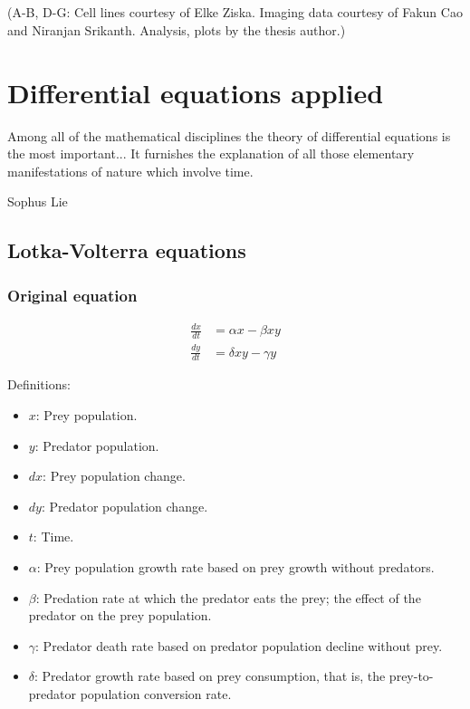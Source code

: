 \begin{centering}
{\\
\\
(A-B, D-G: Cell lines courtesy of Elke Ziska. Imaging data courtesy of Fakun Cao and Niranjan Srikanth. Analysis, plots by the thesis author.)}
\label{p3:2}
\end{centering}

\chapter{Differential equations applied}
\label{chapter:differential_equations}
\epigraph{Among all of the mathematical disciplines the theory of differential equations is the most important... It furnishes the explanation of all those elementary manifestations of nature which involve time.}{Sophus Lie}

\section{Lotka-Volterra equations}
\subsection{Original equation}
\begin{align*}
\frac{dx}{dt} &= \alpha x - \beta x y \\
\frac{dy}{dt} &= \delta x y -\gamma y
\end{align*}

Definitions:
\begin{itemize}
\item $x$: Prey population.
\item $y$: Predator population.
\item $dx$: Prey population change.
\item $dy$: Predator population change.
\item $t$: Time.
\item $\alpha$: Prey population growth rate based on prey growth without predators.
\item $\beta$: Predation rate at which the predator eats the prey; the effect of the predator on the prey population.
\item $\gamma$: Predator death rate based on predator population decline without prey.
\item $\delta$: Predator growth rate based on prey consumption, that is, the prey-to-predator population conversion rate.
\end{itemize}

